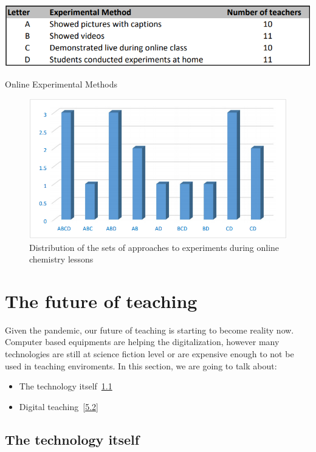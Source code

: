 \documentclass[10pt,oneside,english,a4paper]{article}
\begin{document}
\begin{table}[tbh]
\centering
\includegraphics[scale=.6]{coronavirus_1.png}
\caption{Online Experimental Methods\cite{Babinkov2020}}
\label{f:rozhod}
\end{table}

\begin{figure}[tbh!]
\centering
\includegraphics[scale=.55]{coronavirus_2.png}
\caption{Distribution of the sets of approaches to experiments during online chemistry lessons\cite{Babinkov2020}}
\label{f:rozhod}
\end{figure}


\section{The future of teaching}\label{future}

	Given the pandemic, our future of teaching is starting to become reality now. Computer based equipments are helping the digitalization, however many technologies are still at science fiction level or are expensive enough to not be used in teaching enviroments. In this section, we are going to talk about:

\begin{itemize}
\item The technology itself~\ref{5.1}
\item Digital teaching~\ref{5.2}
\end{itemize}

\subsection{The technology itself}\label{5.1}
\end{document}

